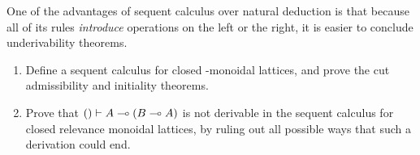 \begin{ex}\label{ex:seqcalc-logic}
  One of the advantages of sequent calculus over natural deduction is that because all of its rules \emph{introduce} operations on the left or the right, it is easier to conclude underivability theorems.
  \begin{enumerate}
  \item Define a sequent calculus for closed \fS-monoidal lattices, and prove the cut admissibility and initiality theorems.
  \item Prove that $()\vdash A\multimap (B\multimap A)$ is not derivable in the sequent calculus for closed relevance monoidal lattices, by ruling out all possible ways that such a derivation could end.
  \end{enumerate}
\end{ex}

